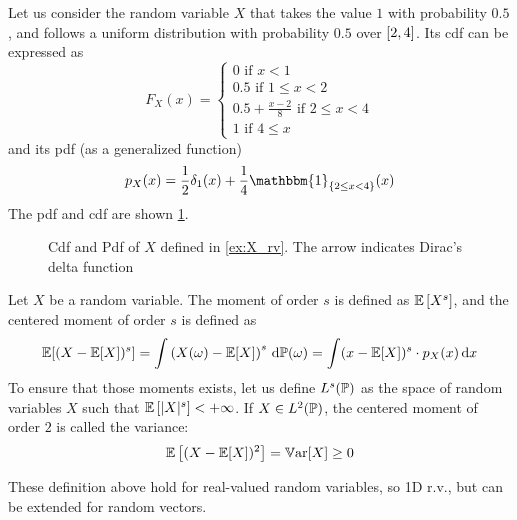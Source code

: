 \documentclass[../../Main_ManuscritThese.tex]{subfiles}
\newcommand\imgpath{/home/victor/acadwriting/Manuscrit/Text/Chapter2/img/}
\begin{document}
\begin{example}
  \label{ex:X_rv}
  Let us consider the random variable $X$ that takes the value $1$
  with probability $0.5$, and follows a uniform distribution with
  probability $0.5$ over $\interval{2}{4}$. Its cdf can be expressed as
  \begin{equation}
    F_X(x) =
    \begin{cases}
      0 \text{ if } x < 1 \\
      0.5 \text{ if } 1 \leq x < 2 \\
      0.5 + \frac{x-2}{8} \text{ if } 2 \leq x < 4 \\
      1 \text{ if } 4 \leq x
    \end{cases}
  \end{equation}
  and its pdf (as a generalized function)
  \begin{equation}
    p_X(x) = \frac{1}{2}\delta_{1}(x) + \frac{1}{4}\mathbbm{1}_{\{2\leq x < 4\}}(x) 
  \end{equation}
  The pdf and cdf are shown \cref{fig:example_pdf_cdf}.
\end{example}
\begin{figure}[!h]
  \centering
  
  \caption[Example of cdf and of pdf]{Cdf and Pdf of $X$ defined in \cref{ex:X_rv}. The arrow indicates Dirac's delta function}
  \label{fig:example_pdf_cdf}
\end{figure}

\begin{definition}
  Let $X$ be a random variable.  The moment of order $s$ is defined as
  $\mathbb{E}\left[X^s\right]$, and the centered moment of order $s$ is
  defined as
  \begin{equation}
    \mathbb{E}[(X-\mathbb{E}[X])^s]=\int \left(X(\omega) - \mathbb{E}[X]\right)^s \,\mathrm{d}\mathbb{P}(\omega) = \int (x-\mathbb{E}[X])^s\cdot p_X(x)\,\mathrm{d}x
  \end{equation}
  To ensure that those moments exists, let us define $L^s(\mathbb{P})$ as
  the space of random variables $X$ such that
  $\mathbb{E}\left[\lvert X \rvert^s\right] < +\infty$.  If
  $X\in L^2(\mathbb{P})$, the centered moment of order $2$ is called the
  variance:
  \begin{equation}
    \label{eq:variance_def}
    \mathbb{E}\left[(X-\mathbb{E}[X])^2 \right] = \mathbb{V}\mathrm{ar}[X] \geq 0
  \end{equation}
\end{definition}

These definition above hold for real-valued random variables, so 1D
r.v., but can be extended for random vectors.
\end{document}

